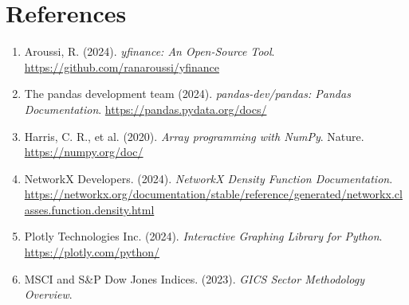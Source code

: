 \documentclass[fontsize=11pt]{article}
\begin{document}
\section*{References}
\begin{enumerate}
    \item Aroussi, R. (2024). \textit{yfinance: An Open-Source Tool}. \url{https://github.com/ranaroussi/yfinance}
    \item The pandas development team (2024). \textit{pandas-dev/pandas: Pandas Documentation}. \url{https://pandas.pydata.org/docs/}
    \item Harris, C. R., et al. (2020). \textit{Array programming with NumPy}. Nature. \url{https://numpy.org/doc/}
    \item NetworkX Developers. (2024). \textit{NetworkX Density Function Documentation}. \url{https://networkx.org/documentation/stable/reference/generated/networkx.classes.function.density.html}
    \item Plotly Technologies Inc. (2024). \textit{Interactive Graphing Library for Python}. \url{https://plotly.com/python/}
    \item MSCI and S\&P Dow Jones Indices. (2023). \textit{GICS Sector Methodology Overview}.
\end{enumerate}
\end{document}
